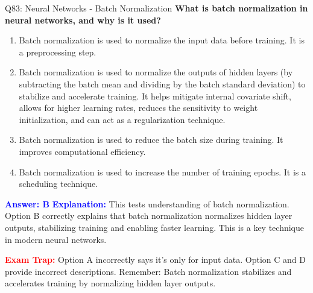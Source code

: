 \documentclass[8pt]{beamer}
\begin{document}
	\begin{frame}{Q83: Neural Networks - Batch Normalization}
		\fontsize{6.5}{7.5}\selectfont
		\textbf{What is batch normalization in neural networks, and why is it used?}
		
		\begin{enumerate}
			\item Batch normalization is used to normalize the input data before training. It is a preprocessing step.
			\item Batch normalization is used to normalize the outputs of hidden layers (by subtracting the batch mean and dividing by the batch standard deviation) to stabilize and accelerate training. It helps mitigate internal covariate shift, allows for higher learning rates, reduces the sensitivity to weight initialization, and can act as a regularization technique.
			\item Batch normalization is used to reduce the batch size during training. It improves computational efficiency.
			\item Batch normalization is used to increase the number of training epochs. It is a scheduling technique.
		\end{enumerate}
		
		\vspace{0.1cm}
		\textcolor{blue}{\textbf{Answer: B}}
		\vspace{0.1cm}
		\textcolor{blue}{\textbf{Explanation:}} This tests understanding of batch normalization. Option B correctly explains that batch normalization normalizes hidden layer outputs, stabilizing training and enabling faster learning. This is a key technique in modern neural networks.
		
		\textcolor{red}{\textbf{Exam Trap:}} Option A incorrectly says it's only for input data. Option C and D provide incorrect descriptions. Remember: Batch normalization stabilizes and accelerates training by normalizing hidden layer outputs.
	\end{frame}
	
\end{document}
